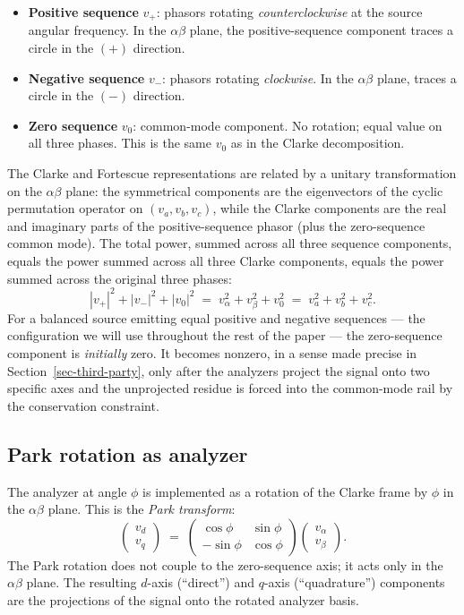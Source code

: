 \documentclass[
  11pt]{article}
\providecommand{\tightlist}{%
  \setlength{\itemsep}{0pt}\setlength{\parskip}{0pt}}
\begin{document}
\begin{itemize}
\tightlist
\item
  \textbf{Positive sequence} \(v_+\): phasors rotating
  \emph{counterclockwise} at the source angular frequency. In the
  \(\alpha\beta\) plane, the positive-sequence component traces a circle
  in the \((+)\) direction.
\item
  \textbf{Negative sequence} \(v_-\): phasors rotating \emph{clockwise}.
  In the \(\alpha\beta\) plane, traces a circle in the \((-)\)
  direction.
\item
  \textbf{Zero sequence} \(v_0\): common-mode component. No rotation;
  equal value on all three phases. This is the same \(v_0\) as in the
  Clarke decomposition.
\end{itemize}

The Clarke and Fortescue representations are related by a unitary
transformation on the \(\alpha\beta\) plane: the symmetrical components
are the eigenvectors of the cyclic permutation operator on
\((v_a, v_b, v_c)\), while the Clarke components are the real and
imaginary parts of the positive-sequence phasor (plus the zero-sequence
common mode). The total power, summed across all three sequence
components, equals the power summed across all three Clarke components,
equals the power summed across the original three phases: \[
|v_+|^2 + |v_-|^2 + |v_0|^2 \;=\; v_\alpha^2 + v_\beta^2 + v_0^2 \;=\; v_a^2 + v_b^2 + v_c^2.
\] For a balanced source emitting equal positive and negative sequences
--- the configuration we will use throughout the rest of the paper ---
the zero-sequence component is \emph{initially} zero. It becomes
nonzero, in a sense made precise in Section~\ref{sec-third-party}, only
after the analyzers project the signal onto two specific axes and the
unprojected residue is forced into the common-mode rail by the
conservation constraint.

\subsection{Park rotation as analyzer}\label{park-rotation-as-analyzer}

The analyzer at angle \(\phi\) is implemented as a rotation of the
Clarke frame by \(\phi\) in the \(\alpha\beta\) plane. This is the
\emph{Park transform}: \[
\begin{pmatrix} v_d \\ v_q \end{pmatrix} \;=\; \begin{pmatrix} \cos\phi & \sin\phi \\ -\sin\phi & \cos\phi \end{pmatrix} \begin{pmatrix} v_\alpha \\ v_\beta \end{pmatrix}.
\] The Park rotation does not couple to the zero-sequence axis; it acts
only in the \(\alpha\beta\) plane. The resulting \(d\)-axis (``direct'')
and \(q\)-axis (``quadrature'') components are the projections of the
signal onto the rotated analyzer basis.
\end{document}
